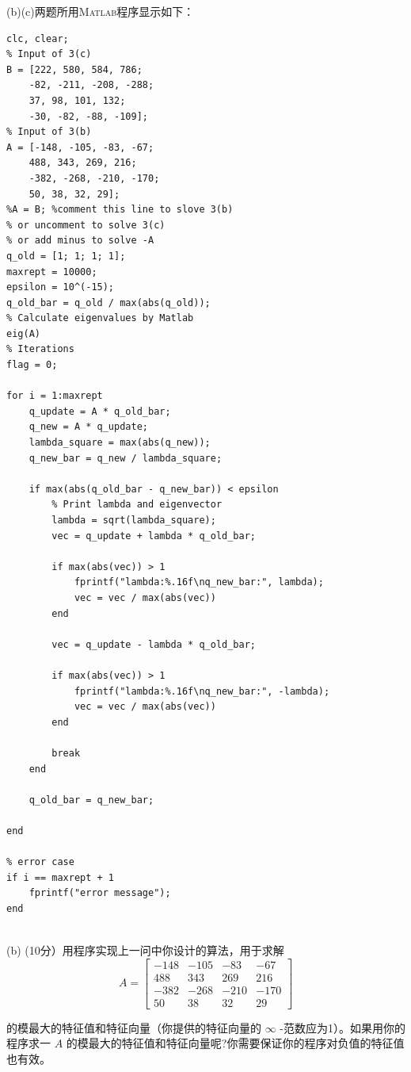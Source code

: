 \documentclass[12pt,a4paper,UTF8]{ctexart}
\begin{document}
\begin{enumerate}
          (b)(c)两题所用\textsc{Matlab}程序显示如下：
          \begin{lstlisting}[frame=single]
clc, clear;
% Input of 3(c)
B = [222, 580, 584, 786;
    -82, -211, -208, -288;
    37, 98, 101, 132;
    -30, -82, -88, -109];
% Input of 3(b)
A = [-148, -105, -83, -67;
    488, 343, 269, 216;
    -382, -268, -210, -170;
    50, 38, 32, 29];
%A = B; %comment this line to slove 3(b)
% or uncomment to solve 3(c)
% or add minus to solve -A
q_old = [1; 1; 1; 1];
maxrept = 10000;
epsilon = 10^(-15);
q_old_bar = q_old / max(abs(q_old));
% Calculate eigenvalues by Matlab
eig(A)
% Iterations
flag = 0;

for i = 1:maxrept
    q_update = A * q_old_bar;
    q_new = A * q_update;
    lambda_square = max(abs(q_new));
    q_new_bar = q_new / lambda_square;

    if max(abs(q_old_bar - q_new_bar)) < epsilon
        % Print lambda and eigenvector
        lambda = sqrt(lambda_square);
        vec = q_update + lambda * q_old_bar;

        if max(abs(vec)) > 1
            fprintf("lambda:%.16f\nq_new_bar:", lambda);
            vec = vec / max(abs(vec))
        end

        vec = q_update - lambda * q_old_bar;

        if max(abs(vec)) > 1
            fprintf("lambda:%.16f\nq_new_bar:", -lambda);
            vec = vec / max(abs(vec))
        end

        break
    end

    q_old_bar = q_new_bar;

end

% error case
if i == maxrept + 1
    fprintf("error message");
end


        \end{lstlisting}
          (b) (10分）用程序实现上一问中你设计的算法，用于求解
          \begin{equation}
              A=\left[\begin{array}{rrrr}
                      -148 & -105 & -83  & -67  \\
                      488  & 343  & 269  & 216  \\
                      -382 & -268 & -210 & -170 \\
                      50   & 38   & 32   & 29
                  \end{array}\right]
          \end{equation}


          的模最大的特征值和特征向量（你提供的特征向量的 $\infty$ -范数应为1）。如果用你的程序求一 $A$ 的模最大的特征值和特征向量呢?你需要保证你的程序对负值的特征值也有效。


\end{enumerate}
\end{document}
